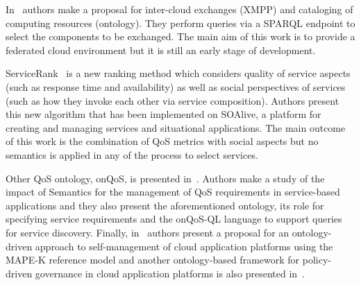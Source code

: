 In~\cite{DBLP:conf/ic/BernsteinV10} authors make a proposal for inter-cloud 
exchanges (XMPP) and cataloging of computing resources (ontology). They 
perform queries via a SPARQL endpoint to select the components to be exchanged. The main 
aim of this work is to provide a federated cloud environment but it is still an 
early stage of development.

ServiceRank~\cite{Wu:2009:CQS:1696051.1696105} is a new ranking method which 
considers quality of service aspects (such as response time and availability) as 
well as social perspectives of services (such as how they invoke each other via 
service composition). Authors present this new algorithm that has been 
implemented on SOAlive, a platform for creating and managing services and 
situational applications. The main outcome of this work is the combination of 
QoS metrics with social aspects but no semantics is applied in any of the 
process to select services. 

Other QoS ontology, onQoS, is presented in~\cite{Damiano:2009:OQL:1506129.1506143}. 
Authors make a study of the impact of Semantics for the management of QoS requirements in service-based 
applications and they also present the aforementioned ontology, its role for 
specifying service requirements and the onQoS-QL language to support queries for 
service discovery. Finally, in~\cite{Dautov:2013:ASC:2462307.2462312} authors present a proposal for an 
ontology-driven approach to self-management of cloud application platforms using 
the MAPE-K reference model and another ontology-based framework for policy-driven 
governance in cloud application platforms is also presented in~\cite{DBLP:conf/icsoc/KourtesisP11}.

